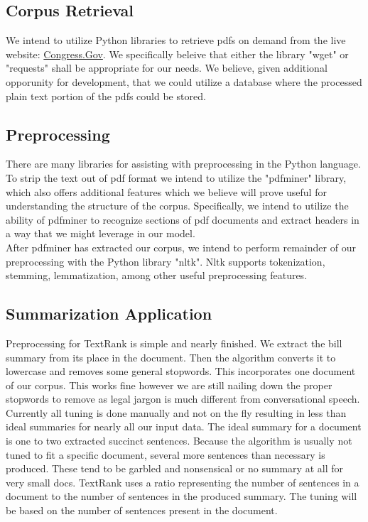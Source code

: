 \documentclass[11pt,a4paper]{article}
\begin{document}
\subsection{Corpus Retrieval}
We intend to utilize Python libraries to retrieve pdfs on demand from the live website: \url{Congress.Gov}. We specifically beleive that either the library "wget" or "requests" shall be appropriate for our needs. We believe, given additional opporunity for development, that we could utilize a database where the processed plain text portion of the pdfs could be stored.
\subsection{Preprocessing}
There are many libraries for assisting with preprocessing in the Python language. To strip the text out of pdf format we intend to utilize the "pdfminer" library, which also offers additional features which we believe will prove useful for understanding the structure of the corpus. Specifically, we intend to utilize the ability of pdfminer to recognize sections of pdf documents and extract headers in a way that we might leverage in our model.\\
After pdfminer has extracted our corpus, we intend to perform remainder of our preprocessing with the Python library "nltk". Nltk supports tokenization, stemming, lemmatization, among other useful preprocessing features.
\subsection{Summarization Application}
Preprocessing for TextRank is simple and nearly finished. We extract the bill summary from its place in the document. Then the algorithm converts it to lowercase and removes some general stopwords. This incorporates one document of our corpus. This works fine however we are still nailing down the proper stopwords to remove as legal jargon is much different from conversational speech. \newline
\newline
Currently all tuning is done manually and not on the fly resulting in less than ideal summaries for nearly all our input data. The ideal summary for a document is one to two extracted succinct sentences. Because the algorithm is usually not tuned to fit a specific document, several more sentences than necessary is produced. These tend to be garbled and nonsensical or no summary at all for very small docs. TextRank uses a ratio representing the number of sentences in a document to the number of sentences in the produced summary. The tuning will be based on the number of sentences present in the document. 
\end{document}
